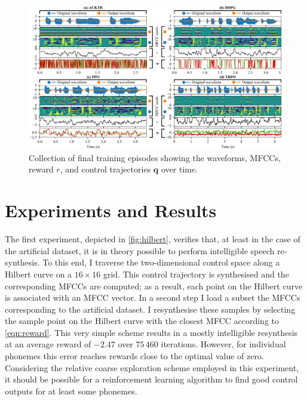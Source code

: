 \documentclass[letterpaper,10pt,conference]{ieeeconf}
\renewcommand{\vec}[1]{\bm{#1}}
\begin{document}
\begin{figure}[p]
	\centering
	\includegraphics[scale=0.825]{media/results_examples.pdf}
	\caption{Collection of final training episodes showing the waveforms, MFCCs, reward $r$, and control trajectories $\vec q$ over time.}
	\label{fig:results_examples}
\end{figure}

\section{Experiments and Results}
\label{sec:experiments}

The first experiment, depicted in \cref{fig:hilbert}, verifies that, at least in the case of the artificial dataset, it is in theory possible to perform intelligible speech re-synthesis. To this end, I traverse the two-dimensional control space along a Hilbert curve on a $16 \times 16$ grid. This control trajectory is synthesised and the corresponding MFCCs are computed; as a result, each point on the Hilbert curve is associated with an MFCC vector. In a second step I load a subset the MFCCs corresponding to the artificial dataset. I resynthesise these samples by selecting the sample point on the Hilbert curve with the closest MFCC according to \cref{eqn:reward}. This very simple scheme results in a mostly intelligible resynthesis at an average reward of $-2.47$ over $75\,460$ iterations. However, for individual phonemes this error reaches rewards close to the optimal value of zero. Considering the relative coarse exploration scheme employed in this experiment, it should be possible for a reinforcement learning algorithm to find good control outputs for at least some phonemes.
\end{document}
